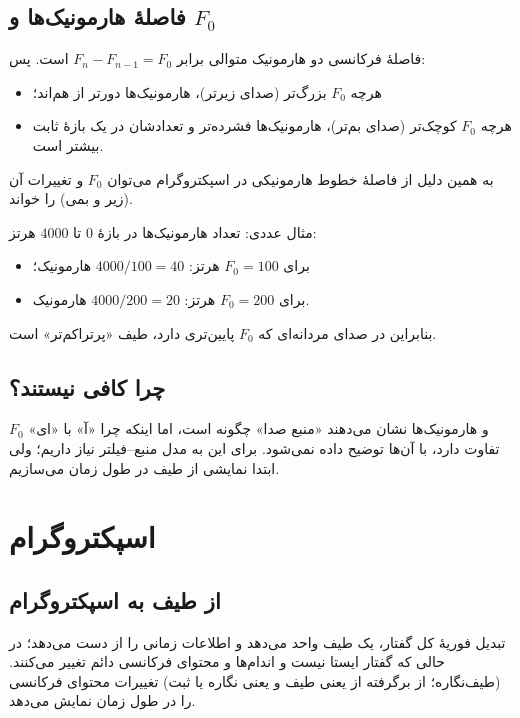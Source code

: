 \subsection{فاصلهٔ هارمونیک‌ها و $F_0$}
فاصلهٔ فرکانسی دو هارمونیک متوالی برابر $F_n-F_{n-1}=F_0$ است. پس:
\begin{itemize}
  \item هرچه $F_0$ بزرگ‌تر (صدای زیرتر)، هارمونیک‌ها دورتر از هم‌اند؛
  \item هرچه $F_0$ کوچک‌تر (صدای بم‌تر)، هارمونیک‌ها فشرده‌تر و تعدادشان در یک بازهٔ ثابت بیشتر است.
\end{itemize}
به همین دلیل از فاصلهٔ خطوط هارمونیکی در اسپکتروگرام می‌توان $F_0$ و تغییرات آن (زیر و بمی) را خواند.

\begin{addedbox}{مثال عددی: تعداد هارمونیک‌ها}
در بازهٔ $0$ تا $4000$ هرتز:
\begin{itemize}
  \item برای $F_0=100$ هرتز: ${4000}/{100}=40$ هارمونیک؛
  \item برای $F_0=200$ هرتز: ${4000}/{200}=20$ هارمونیک.
\end{itemize}
بنابراین در صدای مردانه‌ای که $F_0$ پایین‌تری دارد، طیف «پرتراکم‌تر» است.
\end{addedbox}

\subsection{چرا کافی نیستند؟}
$F_0$ و هارمونیک‌ها نشان می‌دهند «منبع صدا» چگونه است، اما اینکه چرا «آ» با «ای» تفاوت دارد، با آن‌ها توضیح داده نمی‌شود. برای این به مدل منبع--فیلتر نیاز داریم؛ ولی ابتدا نمایشی از طیف در طول زمان می‌سازیم.

\section{اسپکتروگرام}

\subsection{از طیف به اسپکتروگرام}
تبدیل فوریهٔ کل گفتار، یک طیف واحد می‌دهد و اطلاعات زمانی را از دست می‌دهد؛ در حالی که گفتار ایستا نیست و اندام‌ها و محتوای فرکانسی دائم تغییر می‌کنند.  (طیف‌نگاره؛ از  برگرفته از  یعنی طیف و  یعنی نگاره یا ثبت) تغییرات محتوای فرکانسی را در طول زمان نمایش می‌دهد.

